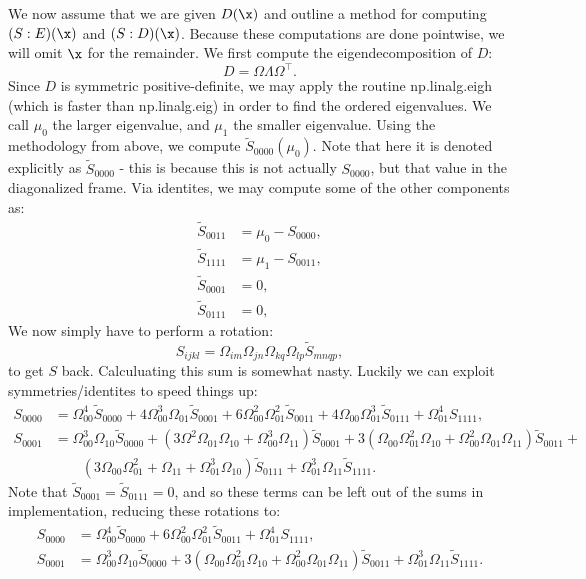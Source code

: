 \documentclass{article}
\begin{document}
We now assume that we are given $D(\x)$ and outline a method for computing $(S:E)(\x)$ and $(S:D)(\x)$. Because these computations are done pointwise, we will omit $\x$ for the remainder. We first compute the eigendecomposition of $D$:
\begin{equation}
    D = \Omega\Lambda\Omega^\intercal.
\end{equation}
Since $D$ is symmetric positive-definite, we may apply the routine np.linalg.eigh (which is faster than np.linalg.eig) in order to find the ordered eigenvalues. We call $\mu_0$ the larger eigenvalue, and $\mu_1$ the smaller eigenvalue. Using the methodology from above, we compute $\tilde S_{0000}(\mu_0)$. Note that here it is denoted explicitly as $\tilde S_{0000}$ - this is because this is not actually $S_{0000}$, but that value in the diagonalized frame. Via identites, we may compute some of the other components as:
\begin{align}
    \tilde S_{0011} &= \mu_0 - S_{0000},    \\
    \tilde S_{1111} &= \mu_1 - S_{0011},    \\
    \tilde S_{0001} &= 0, \\
    \tilde S_{0111} &= 0,
\end{align}
We now simply have to perform a rotation:
\begin{equation}
    S_{ijkl} = \Omega_{im}\Omega_{jn}\Omega_{kq}\Omega_{lp}\tilde S_{mnqp},
\end{equation}
to get $S$ back. Calculuating this sum is somewhat nasty. Luckily we can exploit symmetries/identites to speed things up:
\begin{align}
    S_{0000} &= \Omega_{00}^4\tilde S_{0000} + 4\Omega_{00}^3\Omega_{01}\tilde S_{0001} + 6\Omega_{00}^2\Omega_{01}^2\tilde S_{0011} + 4\Omega_{00}\Omega_{01}^3\tilde S_{0111} + \Omega_{01}^4 S_{1111},  \\
    S_{0001} &= \Omega_{00}^3\Omega_{10}\tilde S_{0000} + (3\Omega^2\Omega_{01}\Omega_{10} + \Omega_{00}^3\Omega_{11})\tilde S_{0001} + 3(\Omega_{00}\Omega_{01}^2\Omega_{10} + \Omega_{00}^2\Omega_{01}\Omega_{11})\tilde S_{0011} +   \\
        &\qquad(3\Omega_{00}\Omega_{01}^2+\Omega_{11}+\Omega_{01}^3\Omega_{10})\tilde S_{0111} + \Omega_{01}^3\Omega_{11}\tilde S_{1111}.
\end{align}
Note that $\tilde S_{0001}=\tilde S_{0111}=0$, and so these terms can be left out of the sums in implementation, reducing these rotations to:
\begin{align}
    S_{0000} &= \Omega_{00}^4\tilde S_{0000} + 6\Omega_{00}^2\Omega_{01}^2\tilde S_{0011} + \Omega_{01}^4 S_{1111},  \\
    S_{0001} &= \Omega_{00}^3\Omega_{10}\tilde S_{0000} + 3(\Omega_{00}\Omega_{01}^2\Omega_{10} + \Omega_{00}^2\Omega_{01}\Omega_{11})\tilde S_{0011} + \Omega_{01}^3\Omega_{11}\tilde S_{1111}.
\end{align}
\end{document}
